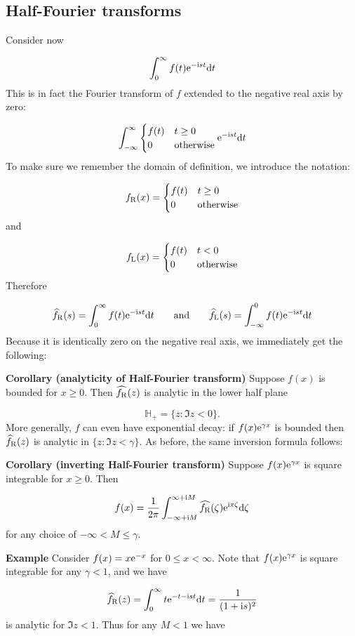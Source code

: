 \documentclass[12pt,a4paper]{article}
\def\qqand{\qquad\hbox{and}\qquad}
\def\D{ {\rm d} }
\def\I{ {\rm i} }
\def\E{ {\rm e} }
\def\H{ {\mathbb H} }
\def\fR{ f_{\rm R} }
\def\fL{ f_{\rm L} }
\def\dt{\D t}
\begin{document}
\subsection{Half-Fourier transforms}
Consider now 

\[
\int_0^\infty f(t) \E^{-\I s t} \dt
\]
This is in fact the Fourier transform of $f$ extended to the negative real axis by zero:

\[
\int_{-\infty}^\infty \begin{cases}f(t) & t \geq 0 \\ 0 & \hbox{otherwise} \end{cases} \E^{-\I s t} \dt
\]
To make sure we remember the domain of definition, we introduce the notation:

\[
f_{\rm R}(x) = \begin{cases}f(t) & t \geq 0 \\ 0 & \hbox{otherwise} \end{cases}
\]
and

\[
f_{\rm L}(x) = \begin{cases}f(t) & t < 0 \\ 0 & \hbox{otherwise} \end{cases}
\]
Therefore 

\[
\widehat\fR(s) = \int_0^\infty f(t) \E^{-\I s t} \dt \qqand \widehat\fL(s) = \int_{-\infty}^0 f(t) \E^{-\I s t} \dt
\]
Because it is identically zero on the negative real axis, we immediately get the following:

\textbf{Corollary (analyticity of Half-Fourier transform)}  Suppose $f(x)$ is bounded for $x \geq 0$.  Then $\widehat{\fR}(z)$ is analytic in the lower half plane 

\[
\H_+ = \{ z : \Im z < 0 \}.
\]
More generally, $f$ can even have exponential decay: if $f(x) \E^{\gamma x}$ is bounded  then $\widehat\fR(z)$ is analytic in $\{z : \Im z < \gamma \}$.  As before, the same inversion formula follows:

\textbf{Corollary  (inverting Half-Fourier transform)}  Suppose  $f(x) \E^{\gamma x}$ is square integrable for $x \geq 0$. Then 

\[
f(x) = {1 \over 2 \pi} \int_{-\infty + \I M}^{\infty + \I M} \widehat{\fR}(\zeta) \E^{\I x \zeta} \D \zeta
\]
for any choice of $-\infty < M \leq \gamma$.

\textbf{Example} Consider $f(x)  = x \E^{-x}$ for $0 \leq x < \infty$.  Note that $f(x) \E^{\gamma x}$  is square integrable for any $\gamma < 1$, and we have

\[
\widehat\fR(z) = \int_0^\infty t \E^{-t -\I s t} \dt = {1 \over (1+\I s)^2}
\]
is analytic for $\Im z < 1$. Thus for any $M < 1$ we have
\end{document}
